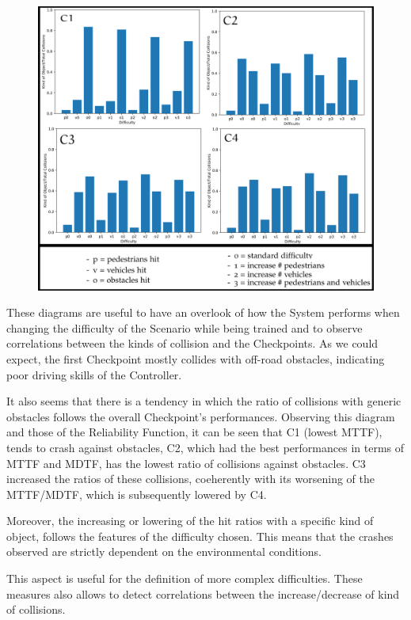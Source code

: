 \begin{figure}[h!]
	\includegraphics[width=\textwidth]{img/hit-ratios.png}
	\caption{}
\end{figure}

These diagrams are useful to have an overlook of how the System performs when changing the difficulty of the Scenario while being trained and to observe correlations between the kinds of collision and the Checkpoints.
As we could expect, the first Checkpoint mostly collides with off-road obstacles, indicating poor driving skills of the Controller.

It also seems that there is a tendency in which the ratio of collisions with generic obstacles follows the overall Checkpoint's performances.
Observing this diagram and those of the Reliability Function, it can be seen that C1 (lowest MTTF), tends to crash against obstacles, C2, which had the best performances in terms of MTTF and MDTF, has the lowest ratio of collisions against obstacles. C3 increased the ratios of these collisions, coeherently with its worsening of the MTTF/MDTF, which is subsequently lowered by C4.

Moreover, the increasing or lowering of the hit ratios with a specific kind of object, follows the features of the difficulty chosen. This means that the crashes observed are strictly dependent on the environmental conditions.

This aspect is useful for the definition of more complex difficulties. These measures also allows to detect correlations between the increase/decrease of kind of collisions.\newline

